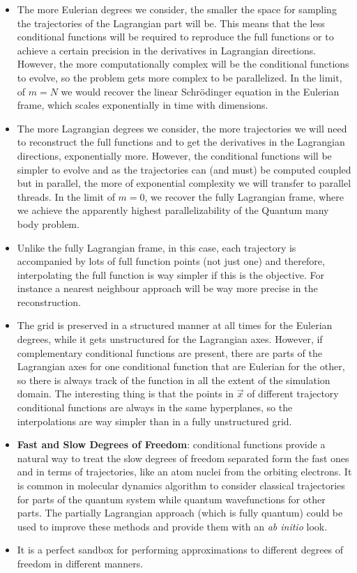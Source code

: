 \documentclass[11pt, a4paper]{article} %
\begin{document}
\begin{itemize}
\item The more Eulerian degrees we consider, the smaller the space for sampling the trajectories of the Lagrangian part will be. This means that the less conditional functions will be required to reproduce the full functions or to achieve a certain precision in the derivatives in Lagrangian directions. However, the more computationally complex will be the conditional functions to evolve, so the problem gets more complex to be parallelized. In the limit, of $m=N$ we would recover the linear Schrödinger equation in the Eulerian frame, which scales exponentially in time with dimensions.

\item The more Lagrangian degrees we consider, the more trajectories we will need to reconstruct the full functions and to get the derivatives in the Lagrangian directions, exponentially more. However, the conditional functions will be simpler to evolve and as the trajectories can (and must) be computed coupled but in parallel, the more of exponential complexity we will transfer to parallel threads. In the limit of $m=0$, we recover the fully Lagrangian frame, where we achieve the apparently highest parallelizability of the Quantum many body problem.

\item Unlike the fully Lagrangian frame, in this case, each trajectory is accompanied by lots of full function points (not just one) and therefore, interpolating the full function is way simpler if this is the objective. For instance a nearest neighbour approach will be way more precise in the reconstruction.

\item The grid is preserved in a structured manner at all times for the Eulerian degrees, while it gets unstructured for the Lagrangian axes. However, if complementary conditional functions are present, there are parts of the Lagrangian axes for one conditional function that are Eulerian for the other, so there is always track of the function in all the extent of the simulation domain. The interesting thing is that the points in $\vec{x}$ of different trajectory conditional functions are always in the same hyperplanes, so the interpolations are way simpler than in a fully unstructured grid.

\item {\bf Fast and Slow Degrees of Freedom}: conditional functions provide a natural way to treat the slow degrees of freedom separated form the fast ones and in terms of trajectories, like an atom nuclei from the orbiting electrons. It is common in molecular dynamics algorithm to consider classical trajectories for parts of the quantum system while quantum wavefunctions for other parts. The partially Lagrangian approach (which is fully quantum) could be used to improve these methods and provide them with an {\em ab initio} look.
\item It is a perfect sandbox for performing approximations to different degrees of freedom in different manners.
\end{itemize}
\end{document}
